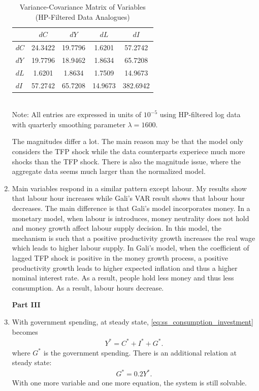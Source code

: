 \documentclass[12pt]{article}
\begin{document}
\begin{enumerate}[label=(\alph*)]
    \begin{table}[H]
        \centering
        \caption{Variance-Covariance Matrix of Variables (HP-Filtered Data Analogues)}
        \label{tab:hw8_h_data}
        \begin{tabular}{lcccc}
        \hline
         & $dC$ & $dY$ & $dL$ & $dI$ \\
        \hline
        $dC$ & 24.3422 & 19.7796 & 1.6201 & 57.2742 \\
        $dY$ & 19.7796 & 18.9462 & 1.8634 & 65.7208 \\
        $dL$ & 1.6201 & 1.8634 & 1.7509 & 14.9673 \\
        $dI$ & 57.2742 & 65.7208 & 14.9673 & 382.6942 \\
        \hline
        \end{tabular}
        \\[0.5em]
        \footnotesize{Note: All entries are expressed in units of $10^{-5}$ using HP-filtered log data with quarterly smoothing parameter $\lambda = 1600$.}
    \end{table}

    The magnitudes differ a lot. The main reason may be that the model only considers the TFP shock while the data counterparts experiece much more shocks than the TFP shock. There is also the magnitude issue, where the aggregate data seems much larger than the normalized model.

    \item Main variables respond in a similar pattern except labour. My results show that labour hour increases while Gali's VAR result shows that labour hour decreases. The main difference is that Gali's model incorporates money. In a monetary model, when labour is introduces, money neutrality does not hold and money growth affect labour supply decision. In this model, the mechanism is such that a positive productivity growth increases the real wage which leads to higher labour supply. In Gali's model, when the coefficient of lagged TFP shock is positive in the money growth process, a positive productivity growth leads to higher expected inflation and thus a higher nominal interest rate. As a result, people hold less money and thus less consumption. As a result, labour hours decrease.

    \newpage
    \noindent\textbf{Part III}
    \item With government spending, at steady state, \eqref{eq:ss_consumption_investment} becomes
    \begin{align}\label{eq:ss_consumption_investment_gov}
        Y^* = C^* + I^* + G^*.
    \end{align}
    where $G^*$ is the government spending. There is an additional relation at steady state:
    \begin{align}\label{eq:ss_gov_relation}
        G^* = 0.2 Y^*.
    \end{align}
    With one more variable and one more equation, the system is still solvable.


\end{enumerate}
\end{document}
